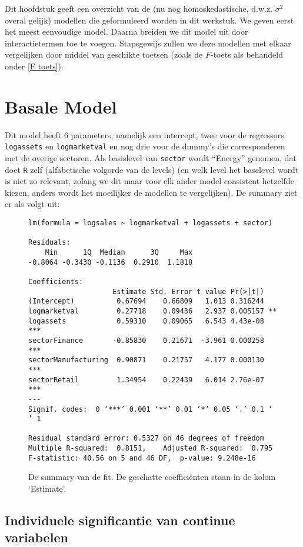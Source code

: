 \documentclass[a4paper]{report}
\begin{document}
  Dit hoofdstuk geeft een overzicht van de (nu nog homoskedastische, d.w.z. $\sigma^2$ overal gelijk) modellen die geformuleerd worden in dit werkstuk. We geven eerst het meest eenvoudige model. Daarna breiden we dit model uit door interactietermen toe te voegen. Stapsgewijs zullen we deze modellen met elkaar vergelijken door middel van geschikte toetsen (zoals de $F$-toets als behandeld onder \ref{F toets}).
  
\section{Basale Model}
\label{Basale Model}
  Dit model heeft 6 parameters, namelijk een intercept, twee voor de regressors \verb!logassets! en \verb!logmarketval! en nog drie voor de dummy's die corresponderen met de overige sectoren. Als basislevel van \verb!sector! wordt ``Energy'' genomen, dat doet \verb!R! zelf (alfabetische volgorde van de levels) (en welk level het baselevel wordt is niet zo relevant, zolang we dit maar voor elk ander model consistent hetzelfde kiezen, anders wordt het moeilijker de modellen te vergelijken). De summary ziet er als volgt uit:
  
  \begin{figure}[H]
  \begin{verbatim}
lm(formula = logsales ~ logmarketval + logassets + sector)

Residuals:
    Min      1Q  Median      3Q     Max 
-0.8064 -0.3430 -0.1136  0.2910  1.1818 

Coefficients:
                    Estimate Std. Error t value Pr(>|t|)    
(Intercept)          0.67694    0.66809   1.013 0.316244    
logmarketval         0.27718    0.09436   2.937 0.005157 ** 
logassets            0.59310    0.09065   6.543 4.43e-08 ***
sectorFinance       -0.85830    0.21671  -3.961 0.000258 ***
sectorManufacturing  0.90871    0.21757   4.177 0.000130 ***
sectorRetail         1.34954    0.22439   6.014 2.76e-07 ***
---
Signif. codes:  0 ‘***’ 0.001 ‘**’ 0.01 ‘*’ 0.05 ‘.’ 0.1 ‘ ’ 1

Residual standard error: 0.5327 on 46 degrees of freedom
Multiple R-squared:  0.8151,	Adjusted R-squared:  0.795 
F-statistic: 40.56 on 5 and 46 DF,  p-value: 9.248e-16
  \end{verbatim}
  \caption{De summary van de fit. De geschatte co\"effici\"enten staan in de kolom `Estimate'. }
  \end{figure}  
  
\subsection{Individuele significantie van continue variabelen}
\end{document}
